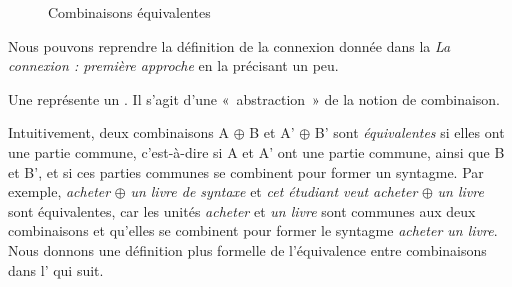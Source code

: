 \begin{figure}%
\caption{Combinaisons équivalentes\label{fig:combiequiv}}
\end{figure}

Nous pouvons reprendre la définition de la connexion donnée dans la  \textit{La connexion : première approche} en la précisant un peu.

{Une  représente un . Il s’agit d’une «~abstraction~» de la notion de combinaison.}

Intuitivement, deux combinaisons A \textrm{${\oplus}$} B et A’ \textrm{${\oplus}$} B’ sont \textit{équivalentes} si elles ont une partie commune, c'est-à-dire si A et A’ ont une partie commune, ainsi que B et B’, et si ces parties communes se combinent pour former un syntagme. Par exemple, \textit{acheter} \textrm{${\oplus}$} \textit{un livre de syntaxe} et \textit{cet étudiant veut acheter} \textrm{${\oplus}$} \textit{un livre} sont équivalentes, car les unités \textit{acheter} et \textit{un livre} sont communes aux deux combinaisons et qu'elles se combinent pour former le syntagme \textit{acheter un livre}. Nous donnons une définition plus formelle de l'équivalence entre combinaisons dans l' qui suit.

